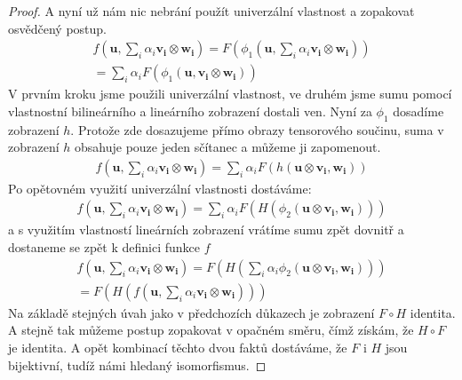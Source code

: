 \documentclass[a5paper,12pt]{amsbook}
\theoremstyle{definition}
\newcommand{\myvec}[1]{\bm{#1}}
\begin{document}
\begin{proof}
\medskip\noindent
A nyní už nám nic nebrání použít univerzální vlastnost a zopakovat osvědčený postup.
\begin{equation*}
\begin{split}
f(\myvec{u}, \sum_{i}\alpha_i\myvec{v_i}\otimes\myvec{w_i}) 
  = F(\phi_1(\myvec{u}, \sum_{i}\alpha_i\myvec{v_i}\otimes\myvec{w_i})) \\
  = \sum_{i}\alpha_i F(\phi_1(\myvec{u}, \myvec{v_i}\otimes\myvec{w_i}))
\end{split}
\end{equation*}
V prvním kroku jsme použili univerzální vlastnost, ve druhém jsme sumu pomocí
vlastnostní bilineárního a lineárního zobrazení dostali ven. Nyní za $\phi_1$
dosadíme zobrazení $h$. Protože zde dosazujeme přímo obrazy tensorového součinu,
suma v zobrazení $h$ obsahuje pouze jeden sčítanec a můžeme ji zapomenout.
\begin{equation*}
\begin{split}
f(\myvec{u}, \sum_{i}\alpha_i\myvec{v_i}\otimes\myvec{w_i}) 
= \sum_{i}\alpha_i F(h(\myvec{u}\otimes\myvec{v_i}, \myvec{w_i}))
\end{split}
\end{equation*}
Po opětovném využití univerzální vlastnosti dostáváme:
\begin{equation*}
\begin{split}
f(\myvec{u}, \sum_{i}\alpha_i\myvec{v_i}\otimes\myvec{w_i}) 
= \sum_{i}\alpha_i F(H(\phi_2(\myvec{u}\otimes\myvec{v_i}, \myvec{w_i})))
\end{split}
\end{equation*}
a s využitím vlastností lineárních zobrazení vrátíme sumu zpět dovnitř a dostaneme
se zpět k definici funkce $f$
\begin{equation*}
\begin{split}
f(\myvec{u}, \sum_{i}\alpha_i\myvec{v_i}\otimes\myvec{w_i}) 
= F(H(\sum_{i}\alpha_i\phi_2(\myvec{u}\otimes\myvec{v_i}, \myvec{w_i}))) \\
= F(H(f(\myvec{u}, \sum_{i}\alpha_i\myvec{v_i}\otimes\myvec{w_i})))
\end{split}
\end{equation*}
Na základě stejných úvah jako v předchozích důkazech je zobrazení $F \circ H$ identita.
A stejně tak můžeme postup zopakovat v opačném směru, čímž získám, že $H \circ F$
je identita. A opět kombinací těchto dvou faktů dostáváme, že $F$ i $H$ jsou bijektivní,
tudíž námi hledaný isomorfismus.
\end{proof}
\end{document}
